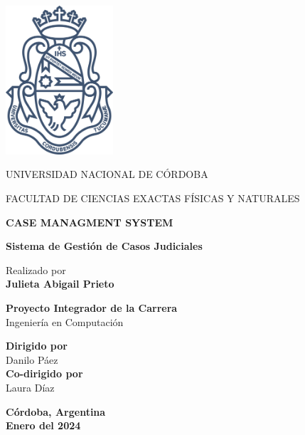 \begin{center}
\vspace*{1cm}

\includegraphics[width=0.3\textwidth]{fig/logoUNC.png}

\vspace*{1cm}
\begin{large}
UNIVERSIDAD NACIONAL DE CÓRDOBA 

FACULTAD DE CIENCIAS EXACTAS FÍSICAS Y NATURALES
\end{large}


\vspace*{0.1in}
\AddToShipoutPictureBG*{\AtPageLowerLeft{%
  \color{US_red!20}\rule{.25\paperwidth}{\paperheight}}}


\textbf{\huge CASE MANAGMENT SYSTEM}

{\Large \textbf{Sistema de Gestión de Casos Judiciales}}
        

\vspace*{.2in}

{\large Realizado por}\\
\textbf{\Large Julieta Abigail Prieto} %

\vspace*{1cm}
\begin{mdframed}[style=US_style]
\centering
\textbf{Proyecto Integrador de la Carrera}\\
{\large Ingeniería en Computación} 

\vspace*{0.2in}

\textbf{Dirigido por}\\
{\large Danilo Páez}\\
\vspace*{0.2in}
\textbf{Co-dirigido por}\\
{\large Laura Díaz}\\

\vspace*{0.2in}
\end{mdframed}


\vspace*{.6in}
\textbf{Córdoba, Argentina}\\
\textbf{Enero del 2024}
\vspace*{0.2in}
\end{center}


\thispagestyle{empty} %
\clearpage\setcounter{page}{1} %
